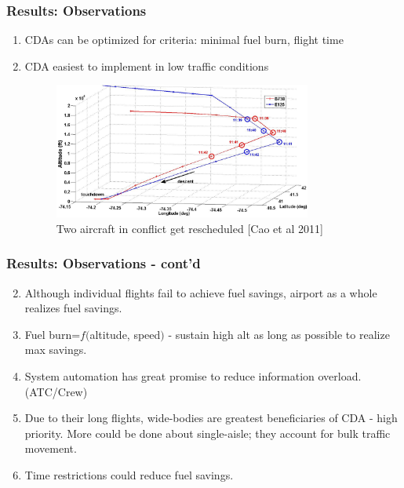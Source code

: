 \documentclass{beamer}
\begin{document}

\begin{frame}
\frametitle{Results: Observations}

\begin{enumerate}[1.]
\item CDAs can be optimized for criteria: minimal fuel burn, flight time
\item CDA easiest to implement in low traffic conditions

\begin{figure}[h!]
\centering
\includegraphics[width=0.8\textwidth]{./figures/reschedule.jpg}\\
{\tiny Two aircraft in conflict get rescheduled [Cao et al 2011]}

\end{figure}
\end{enumerate}
\end{frame}


\begin{frame}
\frametitle{Results: Observations - cont'd}

\begin{enumerate}[1.]
\setcounter{enumi}{1}
\item Although individual flights fail to achieve fuel savings, airport as a whole realizes fuel savings.
\item Fuel burn=$f($altitude, speed$)$ - sustain high alt as long as possible to realize max savings.
\item System automation has great promise to reduce information overload. (ATC/Crew)
\item Due to their long flights, wide-bodies are greatest beneficiaries of CDA - high priority. More could be done about single-aisle; they account for bulk traffic movement.
\item Time restrictions could reduce fuel savings.

\end{enumerate}

\end{frame}
\end{document}
